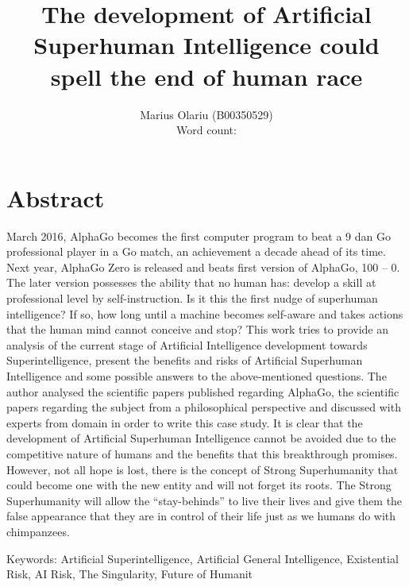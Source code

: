 \documentclass[11pt]{article}
\begin{document}
	\title{The development of Artificial Superhuman Intelligence could spell the end of human race}
	\author{Marius Olariu (B00350529)\\ Word count: }
	\date{}
	\maketitle

\section*{Abstract}
	    March 2016, AlphaGo becomes the first computer program to beat a 9 dan Go professional player in a Go match, an achievement a decade ahead of its time. Next year, AlphaGo Zero is released and beats first version of AlphaGo, 100 – 0. The later version possesses the ability that no human has: develop a skill at professional level by self-instruction. Is it this the first nudge of superhuman intelligence? If so, how long until a machine becomes self-aware and takes actions that the human mind cannot conceive and stop?
    This work tries to provide an analysis of the current stage of Artificial Intelligence development towards Superintelligence, present the benefits and risks of Artificial Superhuman Intelligence and some possible answers to the above-mentioned questions. The author analysed the scientific papers published regarding AlphaGo, the scientific papers regarding the subject from a philosophical perspective and discussed with experts from domain in order to write this case study.
    It is clear that the development of Artificial Superhuman Intelligence cannot be avoided due to the competitive nature of humans and the benefits that this breakthrough promises. However, not all hope is lost, there is the concept of Strong Superhumanity that could become one with the new entity and will not forget its roots. The Strong Superhumanity will allow the “stay-behinds” to live their lives and give them the false appearance that they are in control of their life just as we humans do with chimpanzees.


Keywords: Artificial Superintelligence, Artificial General Intelligence, Existential Risk, AI Risk, The Singularity, Future of Humanit
\end{document}
